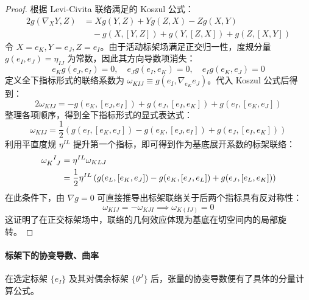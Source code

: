 \begin{proof}
    根据 Levi-Civita 联络满足的 Koszul 公式：
    \begin{equation}
    \begin{aligned}
        2g(\nabla_X Y, Z) &= X g(Y, Z) + Y g(Z, X) - Z g(X, Y) \\
        &\quad - g(X, [Y, Z]) + g(Y, [Z, X]) + g(Z, [X, Y])
    \end{aligned}
    \end{equation}
    令 $X=e_K, Y=e_J, Z=e_I$。由于活动标架场满足正交归一性，度规分量 $g(e_I, e_J) = \eta_{IJ}$ 为常数，因此其方向导数项消失：
    \begin{equation}
        e_K g(e_J, e_I) = 0, \quad e_J g(e_I, e_K) = 0, \quad e_I g(e_K, e_J) = 0
    \end{equation}
    定义全下指标形式的联络系数为 $\omega_{KIJ} \equiv g(e_I, \nabla_{e_K} e_J)$。代入 Koszul 公式后得到：
    \begin{equation}
        2\omega_{KIJ} = - g(e_K, [e_J, e_I]) + g(e_J, [e_I, e_K]) + g(e_I, [e_K, e_J])
    \end{equation}
    整理各项顺序，得到全下指标形式的显式表达式：
    \begin{equation}
        \omega_{KIJ} = \frac{1}{2} \left( g(e_I, [e_K, e_J]) - g(e_K, [e_J, e_I]) + g(e_J, [e_I, e_K]) \right)
    \end{equation}
    利用平直度规 $\eta^{IL}$ 提升第一个指标，即可得到作为基底展开系数的标架联络：
    \begin{align}
        \tensor{\omega}{_K^I_J} &= \eta^{IL} \omega_{KLJ} \nonumber \\
        &= \frac{1}{2} \eta^{IL} \left( g(e_L, [e_K, e_J]) - g(e_K, [e_J, e_L]) + g(e_J, [e_L, e_K]) \right)
    \end{align}
    在此条件下，由 $\nabla g = 0$ 可直接推导出标架联络关于后两个指标具有反对称性：
    \begin{equation}
        \omega_{KIJ} = - \omega_{KJI} \implies \omega_{K(IJ)} = 0
    \end{equation}
    这证明了在正交标架场中，联络的几何效应体现为基底在切空间内的局部旋转。
\end{proof}

\paragraph{标架下的协变导数、曲率}
在选定标架 $\{e_I\}$ 及其对偶余标架 $\{\theta^J\}$ 后，张量的协变导数便有了具体的分量计算公式。


